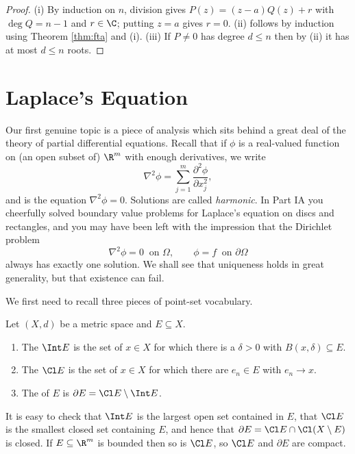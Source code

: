 \begin{proof}
	(i) By induction on $n$, division gives $P(z) = (z-a)Q(z) + r$ with $\deg Q = n-1$ and $r \in \C$; putting $z = a$ gives $r=0$. (ii) follows by induction using Theorem \ref{thm:fta} and (i). (iii) If $P \neq 0$ has degree $d \leq n$ then by (ii) it has at most $d \leq n$ roots.
\end{proof}

\section{Laplace's Equation}

Our first genuine topic is a piece of analysis which sits behind a great deal of the theory of partial differential equations. Recall that if $\phi$ is a real-valued function on (an open subset of) $\R^m$ with enough derivatives, we write
$$\nabla^2 \phi = \sum_{j=1}^m \frac{\partial^2 \phi}{\partial x_j^2},$$
and  is the equation $\nabla^2 \phi = 0$. Solutions are called \emph{harmonic}. In Part IA you cheerfully solved boundary value problems for Laplace's equation on discs and rectangles, and you may have been left with the impression that the Dirichlet problem
$$\nabla^2 \phi = 0 \ \text{ on } \Omega, \qquad \phi = f \ \text{ on } \partial\Omega$$
always has exactly one solution. We shall see that uniqueness holds in great generality, but that existence can fail.

We first need to recall three pieces of point-set vocabulary.

\begin{definition}
	Let $(X,d)$ be a metric space and $E \subseteq X$.
	\begin{enumerate}[label=(\roman*)]
		\item The  $\Int E$ is the set of $x \in X$ for which there is a $\delta>0$ with $B(x,\delta) \subseteq E$.
		\item The  $\Cl E$ is the set of $x \in X$ for which there are $e_n \in E$ with $e_n \to x$.
		\item The  of $E$ is $\partial E = \Cl E \setminus \Int E$.
	\end{enumerate}
\end{definition}

It is easy to check that $\Int E$ is the largest open set contained in $E$, that $\Cl E$ is the smallest closed set containing $E$, and hence that $\partial E = \Cl E \cap \Cl(X \setminus E)$ is closed. If $E \subseteq \R^m$ is bounded then so is $\Cl E$, so $\Cl E$ and $\partial E$ are compact.

